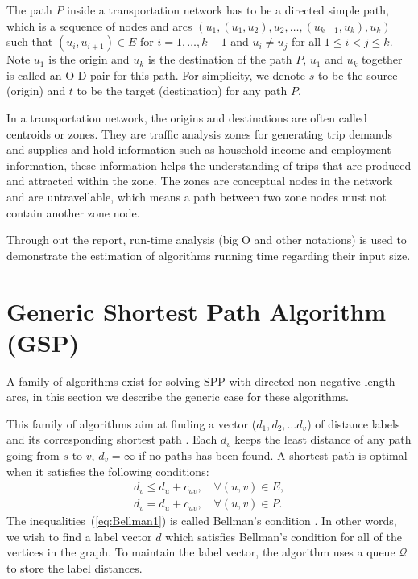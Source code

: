 The path $P$ inside a transportation network has to be a directed simple path, 
which is a sequence of nodes and arcs $ (u_1, (u_1, u_2), u_2, \ldots , (u_{k-1}, u_k), u_k ) $
such that $ (u_i, u_{i+1}) \in E$ for $i = 1,\ldots,k-1$ and $u_i \neq u_j$ for all $ 1 \leq i < j \leq k$.
Note $u_1$ is the origin and $u_k$ is the destination of the path $P$, $u_1$ and $u_k$ together is called an O-D pair for this path.
For simplicity, we denote $s$ to be the source (origin) and $t$ to be the target (destination) for any path $P$.

In a transportation network,
the origins and destinations are often called centroids or zones.
They are traffic analysis zones for generating trip demands and supplies
and hold information such as household income and employment information,
these information helps the understanding of trips that are produced and attracted within the zone.
The zones are conceptual nodes in the network and are untravellable,
which means a path between two zone nodes must not contain another zone node.

Through out the report,
run-time analysis (big O and other notations) is used to demonstrate the estimation of algorithms running time regarding their input size. 

\section{Generic Shortest Path Algorithm (GSP)}
A family of algorithms exist for solving SPP with directed non-negative length arcs,
in this section we describe the generic case for these
algorithms.

This family of algorithms aim at finding a 
vector ($d_1, d_2,\dots d_v$) of distance labels and its corresponding shortest path \citep{Klunder}.
Each $d_v$ keeps the least distance of any path going from $s$ to $v$, $d_v = \infty$ if no paths has been found.
A shortest path is optimal when it satisfies the following conditions:
\begin{align}
    d_v \leq d_u + c_{uv}, \quad \forall(u,v) \in E, \label{eq:Bellman1}\\
    d_v  =   d_u + c_{uv}, \quad \forall(u,v) \in P.
\end{align}
The inequalities~(\ref{eq:Bellman1}) is called Bellman's condition \citep{Bellman}.
In other words,
we wish to find a label vector $d$ which satisfies Bellman's condition for all of the vertices in the graph.
To maintain the label vector, the algorithm uses a queue $\mathcal{Q}$ to store the label distances.

